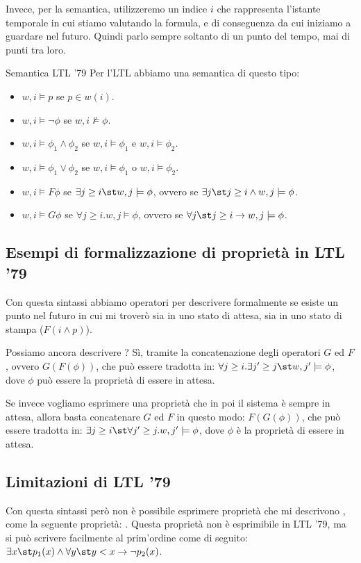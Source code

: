 Invece, per la semantica, utilizzeremo un indice \(i\) che rappresenta l'istante temporale in cui stiamo valutando la formula, e di conseguenza da cui iniziamo a guardare nel futuro. Quindi parlo sempre soltanto di un punto del tempo, mai di punti tra loro.

\begin{definition}{Semantica LTL '79}
  Per l'LTL abbiamo una semantica di questo tipo:
  \begin{itemize}
    \item \(w,i \models p\) se \(p \in w(i)\).
    \item \(w,i \models \neg\phi\) se \(w,i\not\models\phi\).
    \item \(w,i\models\phi_1 \land \phi_2\) se \(w,i\models\phi_1\) e \(w,i\models\phi_2\).
    \item \(w,i\models\phi_1 \lor \phi_2\) se \(w,i\models\phi_1\) o \(w,i\models\phi_2\).
    \item \(w,i\models F\phi\) se \(\exists j \geq i \st w, j \models \phi\), ovvero se \(\exists j\st j \geq i \land w,j\models\phi\).
    \item \(w,i\models G\phi\) se \(\forall j \geq i. w, j \models \phi\), ovvero se \(\forall j\st j \geq i \to w,j\models\phi\).
  \end{itemize}
\end{definition}

\subsection{Esempi di formalizzazione di proprietà in LTL '79}
Con questa sintassi abbiamo operatori per descrivere formalmente se esiste un punto nel futuro in cui mi troverò sia in uno stato di attesa, sia in uno stato di stampa (\(F(i\land p)\)).

Possiamo ancora descrivere ? Sì, tramite la concatenazione degli operatori \(G\) ed \(F\), ovvero \(G(F(\phi))\), che può essere tradotta in: \(\forall j \geq i.\exists j'\geq j \st w, j' \models \phi\), dove \(\phi\) può essere la proprietà di essere in attesa.

Se invece vogliamo esprimere una proprietà che  in poi il sistema è sempre in attesa, allora basta concatenare \(G\) ed \(F\) in questo modo: \(F(G(\phi))\),
che può essere tradotta in: \(\exists j \geq i\st \forall j'\geq j. w,j' \models\phi\), dove \(\phi\) è la proprietà di essere in attesa.

\subsection{Limitazioni di LTL '79}
Con questa sintassi però non è possibile esprimere proprietà che mi descrivono , come la seguente proprietà: .
Questa proprietà non è esprimibile in LTL '79, ma si può scrivere facilmente al prim'ordine come di seguito: \(\exists x \st p_1(x) \land \forall y\st y < x \to \neg p_2(x)\).


